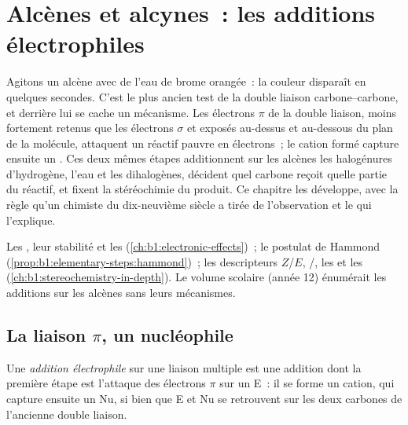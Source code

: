 \chapter{Alcènes et alcynes~: les additions électrophiles}\label{ch:b1:electrophilic-additions}

Agitons un alcène avec de l'eau de brome orangée~: la couleur disparaît
en quelques secondes. C'est le plus ancien test de la double liaison
carbone--carbone, et derrière lui se cache un mécanisme. Les électrons
$\pi$ de la double liaison, moins fortement retenus que les électrons
$\sigma$ et exposés au-dessus et au-dessous du plan de la molécule,
attaquent un réactif pauvre en électrons~; le cation formé capture
ensuite un . Ces deux mêmes étapes additionnent sur les
alcènes les halogénures d'hydrogène, l'eau et les dihalogènes,
décident quel carbone reçoit quelle partie du réactif, et fixent la
stéréochimie du produit. Ce chapitre les développe, avec la règle
qu'un chimiste du dix-neuvième siècle a tirée de
l'observation et le  qui l'explique.

\begin{recall}
Les , leur stabilité et les 
(\cref{ch:b1:electronic-effects})~; le postulat de Hammond
(\cref{prop:b1:elementary-steps:hammond})~; les descripteurs $Z$/$E$,
/, les  et les 
(\cref{ch:b1:stereochemistry-in-depth}). Le volume scolaire (année 12)
énumérait les additions sur les alcènes sans leurs mécanismes.
\end{recall}

\section{La liaison \texorpdfstring{$\pi$}{pi}, un nucléophile}

\begin{definition}\label{def:b1:electrophilic-additions:electrophilic-addition}
Une \emph{addition électrophile} sur une
liaison multiple est une addition dont la première étape est l'attaque
des électrons $\pi$ sur un  E~: il se forme un cation, qui
capture ensuite un  Nu, si bien que E et Nu se retrouvent sur
les deux carbones de l'ancienne double liaison.
\end{definition}

